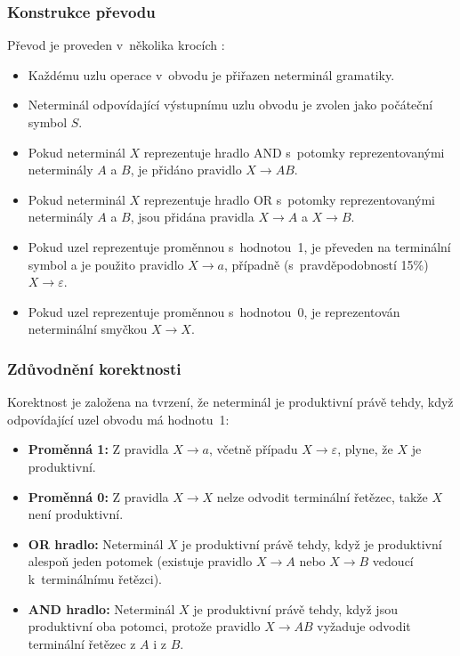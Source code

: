 \subsubsection*{Konstrukce převodu}
Převod je proveden v~několika krocích \cite{sawa}:

\begin{itemize}
    \item Každému uzlu operace v~obvodu je přiřazen neterminál gramatiky.
    \item Neterminál odpovídající výstupnímu uzlu obvodu je zvolen jako počáteční symbol $S$.
    \item Pokud neterminál $X$ reprezentuje hradlo AND s~potomky reprezentovanými neterminály $A$ a $B$, je přidáno pravidlo $X \to AB$.
    \item Pokud neterminál $X$ reprezentuje hradlo OR s~potomky reprezentovanými neterminály $A$ a $B$, jsou přidána pravidla $X \to A$ a $X \to B$.
    \item Pokud uzel reprezentuje proměnnou s~hodnotou~1, je převeden na terminální symbol a je použito pravidlo $X \to a$, případně (s~pravděpodobností 15\%) $X \to \varepsilon$.
    \item Pokud uzel reprezentuje proměnnou s~hodnotou~0, je reprezentován neterminální smyčkou $X \to X$.
\end{itemize}

\subsubsection*{Zdůvodnění korektnosti}
Korektnost je založena na tvrzení, že neterminál je produktivní právě tehdy, když odpovídající uzel obvodu má hodnotu~1:

\begin{itemize}
    \item \textbf{Proměnná 1:} Z pravidla $X \to a$, včetně případu $X \to \varepsilon$, plyne, že $X$ je produktivní.
    \item \textbf{Proměnná 0:} Z pravidla $X \to X$ nelze odvodit terminální řetězec, takže $X$ není produktivní.
    \item \textbf{OR hradlo:} Neterminál $X$ je produktivní právě tehdy, když je produktivní alespoň jeden potomek (existuje pravidlo $X \to A$ nebo $X \to B$ vedoucí k~terminálnímu řetězci).
    \item \textbf{AND hradlo:} Neterminál $X$ je produktivní právě tehdy, když jsou produktivní oba potomci, protože pravidlo $X \to AB$ vyžaduje odvodit terminální řetězec z $A$ i z $B$.
\end{itemize}


